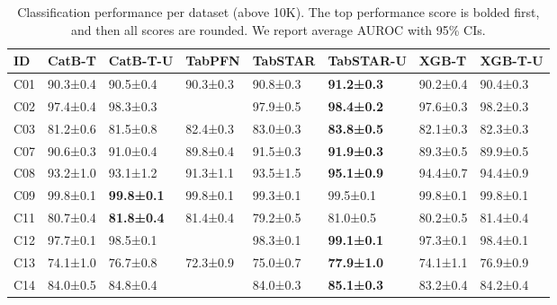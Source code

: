 \begin{table}
\center
\footnotesize
\caption{Classification performance per dataset (above 10K). The top performance score is bolded first, and then all scores are rounded. We report average AUROC with 95\% CIs.}
\label{tab:cls_unlimit_dataset_performance}
\begin{tabular}{llllllll}
\toprule
ID & CatB-T & CatB-T-U & TabPFN & TabSTAR & TabSTAR-U & XGB-T & XGB-T-U \\
\midrule
C01 & 90.3±0.4 & 90.5±0.4 & 90.3±0.3 & 90.8±0.3 & \textbf{91.2±0.3} & 90.2±0.4 & 90.4±0.3 \\
C02 & 97.4±0.4 & 98.3±0.3 &  & 97.9±0.5 & \textbf{98.4±0.2} & 97.6±0.3 & 98.2±0.3 \\
C03 & 81.2±0.6 & 81.5±0.8 & 82.4±0.3 & 83.0±0.3 & \textbf{83.8±0.5} & 82.1±0.3 & 82.3±0.3 \\
C07 & 90.6±0.3 & 91.0±0.4 & 89.8±0.4 & 91.5±0.3 & \textbf{91.9±0.3} & 89.3±0.5 & 89.9±0.5 \\
C08 & 93.2±1.0 & 93.1±1.2 & 91.3±1.1 & 93.5±1.5 & \textbf{95.1±0.9} & 94.4±0.7 & 94.4±0.9 \\
C09 & 99.8±0.1 & \textbf{99.8±0.1} & 99.8±0.1 & 99.3±0.1 & 99.5±0.1 & 99.8±0.1 & 99.8±0.1 \\
C11 & 80.7±0.4 & \textbf{81.8±0.4} & 81.4±0.4 & 79.2±0.5 & 81.0±0.5 & 80.2±0.5 & 81.4±0.4 \\
C12 & 97.7±0.1 & 98.5±0.1 &  & 98.3±0.1 & \textbf{99.1±0.1} & 97.3±0.1 & 98.4±0.1 \\
C13 & 74.1±1.0 & 76.7±0.8 & 72.3±0.9 & 75.0±0.7 & \textbf{77.9±1.0} & 74.1±1.1 & 76.9±0.9 \\
C14 & 84.0±0.5 & 84.8±0.4 &  & 84.0±0.3 & \textbf{85.1±0.3} & 83.2±0.4 & 84.2±0.4 \\
\bottomrule
\end{tabular}
\end{table}

